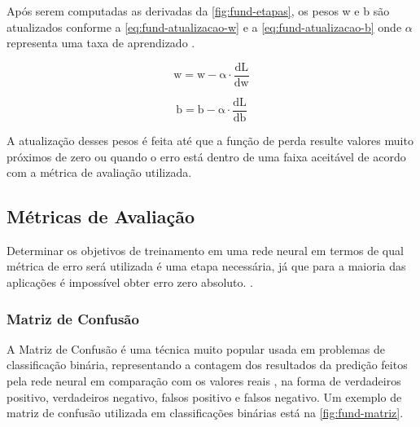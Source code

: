 Após serem computadas as derivadas da \autoref{fig:fund-etapas}, os pesos w e b são atualizados conforme a \autoref{eq:fund-atualizacao-w} e a \autoref{eq:fund-atualizacao-b} onde $\alpha$ representa uma taxa de aprendizado \cite{ref:Ng}.

\begin{equation} \label{eq:fund-atualizacao-w}
  \mathrm{
    w = w - \alpha \cdot \frac{dL}{dw}
  }
\end{equation}

\begin{equation} \label{eq:fund-atualizacao-b}
  \mathrm{
    b = b - \alpha \cdot \frac{dL}{db}
  }
\end{equation}

A atualização desses pesos é feita até que a função de perda resulte valores muito próximos de zero ou quando o erro está dentro de uma faixa aceitável de acordo com a métrica de avaliação utilizada.



\subsection{Métricas de Avaliação} \label{cap:fund-ia-metricas}
Determinar os objetivos de treinamento em uma rede neural em termos de qual métrica de erro será utilizada é uma etapa necessária, já que para a maioria das aplicações é impossível obter erro zero absoluto. \cite{ref:Goodfellow-Bengio-Courville}.

\subsubsection{Matriz de Confusão} \label{cap:fund-ia-metricas-matriz}
A Matriz de Confusão é uma técnica muito popular usada em problemas de classificação binária, representando a contagem dos resultados da predição feitos pela rede neural em comparação com os valores reais \cite{ref:Batarseh-Yang}, na forma de verdadeiros positivo, verdadeiros negativo, falsos positivo e falsos negativo. Um exemplo de matriz de confusão utilizada em classificações binárias está na \autoref{fig:fund-matriz}.

